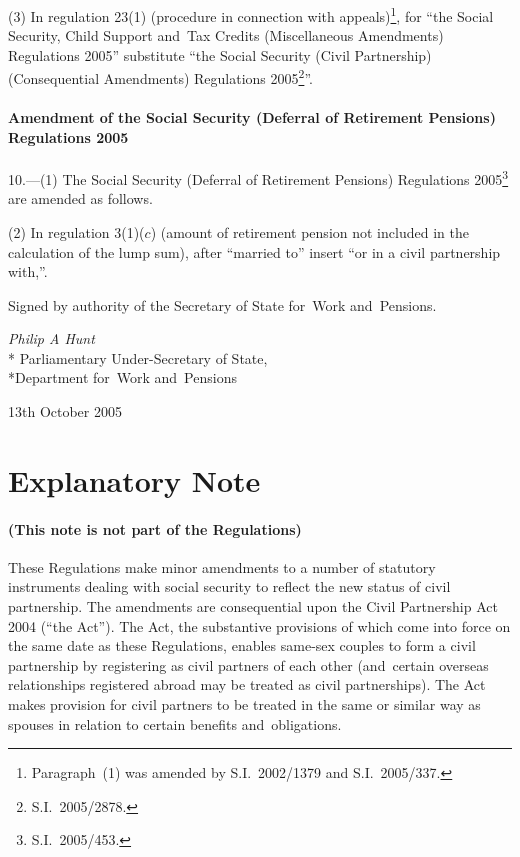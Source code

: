 \documentclass[12pt,a4paper]{article}
\begin{document}
(3) In regulation 23(1) (procedure in connection with appeals)\footnote{Paragraph~(1) was amended by S.I.~2002/1379 and S.I.~2005/337.}, for “the Social Security, Child Support and~Tax Credits (Miscellaneous Amendments) Regulations 2005” substitute “the Social Security (Civil Partnership) (Consequential Amendments) Regulations 2005\footnote{S.I.~2005/2878.}”.

\subsection[10. Amendment of the Social Security (Deferral of Retirement Pensions) Regulations 2005]{Amendment of the Social Security (Deferral of Retirement Pensions) Regulations 2005}

10.---(1)  The Social Security (Deferral of Retirement Pensions) Regulations 2005\footnote{S.I.~2005/453.} are amended as follows.

(2) In regulation 3(1)($c$)  (amount of retirement pension not included in the calculation of the lump sum), after “married to” insert “or in a civil partnership with,”. 

\bigskip

Signed 
by authority of the 
Secretary of State for~Work and~Pensions.

{\raggedleft
\emph{Philip A Hunt}\\*
Parliamentary Under-Secretary 
of State,\\*Department 
for~Work and~Pensions

}

13th October 2005

\small

\part{Explanatory Note}

\renewcommand\parthead{— Explanatory Note}

\subsection*{(This note is not part of the Regulations)}

These Regulations make minor amendments to a number of statutory instruments dealing with social security to reflect the new status of civil partnership. The amendments are consequential upon the Civil Partnership Act 2004 (“the Act”). The Act, the substantive provisions of which come into force on the same date as these Regulations, enables same-sex couples to form a civil partnership by registering as civil partners of each other (and~certain overseas relationships registered abroad may be treated as civil partnerships). The Act makes provision for civil partners to be treated in the same or similar way as spouses in relation to certain benefits and~obligations.
\end{document}
